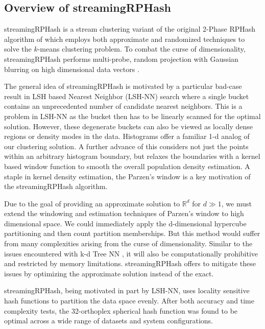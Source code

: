 
\subsection{Overview of \textsf{streamingRPHash}}

\textsf{streamingRPHash} is a stream clustering variant of the original 2-Phase \textsf{RPHash} algorithm of \cite{carraher-15}
which employs both approximate and randomized techniques to solve the $k$-means clustering problem.  To combat the curse
of dimensionality, \textsf{streamingRPHash} performs multi-probe, random projection with Gaussian blurring on high
dimensional data vectors \cite{Andoni}.

The general idea of \textsf{streamingRPHash} is motivated by a particular bad-case result in LSH based Nearest Neighbor
(LSH-NN) search where a single bucket contains an unprecedented number of candidate nearest neighbors.  This is a
problem in LSH-NN as the bucket then has to be linearly scanned for the optimal solution.  However, these degenerate
buckets can also be viewed as locally dense regions or density modes in the data.  Histograms offer a familiar 1-d
analog of our clustering solution.  A further advance of this considers not just the points within an arbitrary
histogram boundary, but relaxes the boundaries with a kernel based window function to smooth the overall population
density estimation.  A staple in kernel density estimation, the Parzen's window is a key motivation of the
\textsf{streamingRPHash} algorithm.

Due to the goal of providing an approximate solution to $\mathbb{R}^d$ for $d\gg1$, we must extend the windowing and
estimation techniques of Parzen's window to high dimensional space.  We could immediately apply the d-dimensional
hypercube partitioning and then count partition memberships.  But this method would suffer from many complexities
arising from the curse of dimensionality.  Similar to the issues encountered with k-d Tree NN \cite{marimont}, it will
also be computationally prohibitive and restricted by memory limitations.  \textsf{streamingRPHash} offers to mitigate
these issues by optimizing the approximate solution instead of the exact.

\textsf{streamingRPHash}, being motivated in part by LSH-NN, uses locality sensitive hash functions to partition the
data space evenly.  After both accuracy and time complexity tests, the 32-orthoplex spherical hash function was found to
be optimal across a wide range of datasets and system configurations.

